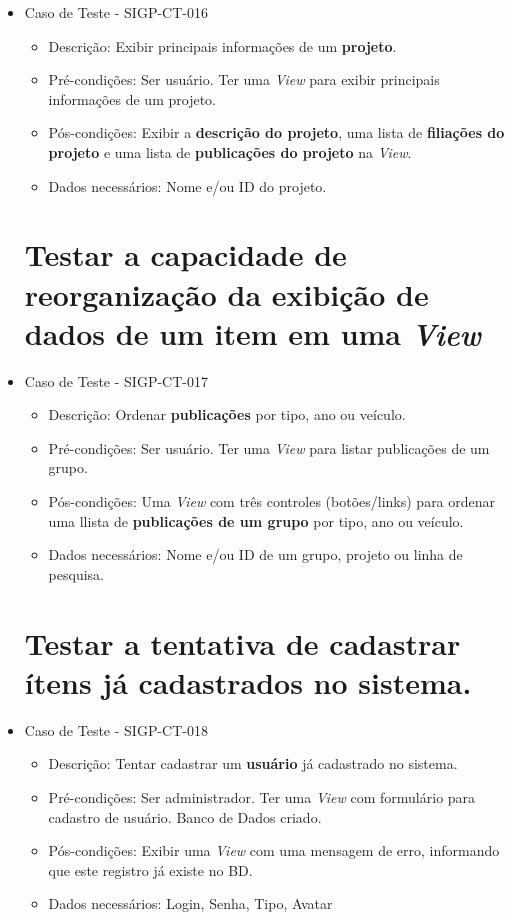 \documentclass[11pt, a4paper]{book}
\begin{document}
\begin{itemize}
	\item Caso de Teste - SIGP-CT-016
	\begin{itemize}
	\item Descrição: Exibir principais informações de um \textbf{projeto}.
	\item Pré-condições: Ser usuário. Ter uma \emph{View} para exibir principais informações de um projeto.
	\item Pós-condições: Exibir a \textbf{descrição do projeto}, uma lista de \textbf{filiações do projeto} e uma lista de \textbf{publicações do projeto} na \emph{View}.
	\item Dados necessários: Nome e/ou ID do projeto.
	\end{itemize}

\newpage
\section{Testar a capacidade de reorganização da exibição de dados de um item em uma \emph{View}}

	\item Caso de Teste - SIGP-CT-017
	\begin{itemize}
	\item Descrição: Ordenar \textbf{publicações} por tipo, ano ou veículo.
	\item Pré-condições: Ser usuário. Ter uma \emph{View} para listar publicações de um grupo.
	\item Pós-condições: Uma \emph{View} com três controles (botões/links) para ordenar uma llista de \textbf{publicações de um grupo} por tipo, ano ou veículo.
	\item Dados necessários: Nome e/ou ID de um grupo, projeto ou linha de pesquisa.
	\end{itemize}

\newpage
\section{Testar a tentativa de cadastrar ítens já cadastrados no sistema.}

	\item Caso de Teste - SIGP-CT-018
	\begin{itemize}
	\item Descrição: Tentar cadastrar um \textbf{usuário} já cadastrado no sistema.
	\item Pré-condições: Ser administrador. Ter uma \emph{View} com formulário para cadastro de usuário. Banco de Dados criado.
	\item Pós-condições: Exibir uma \emph{View} com uma mensagem de erro, informando que este registro já existe no BD.
	\item Dados necessários: Login, Senha, Tipo, Avatar
	\end{itemize}



\end{itemize}
\end{document}
